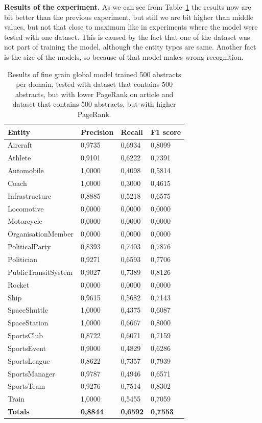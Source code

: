 \documentclass[thesis=M,english]{FITthesis}[2018/05/30]
\begin{document}
\textbf{Results of the experiment.} As we can see from Table~\ref{table:Global500FineDomainTestedWithTwo500Datasets} the results now are bit better than the previous experiment, but still we are bit higher than middle values, but not that close to maximum like in experiments where the model were tested with one dataset. This is caused by the fact that one of the dataset was not part of training the model, although the entity types are same. Another fact is the size of the models, so because of that model makes wrong recognition.

	\begin{table}[H]\centering
		\begin{tabular}{|l|l|l|l|}
			\hline {\textbf{Entity}} & {\textbf{Precision}} & {\textbf{Recall}} & {\textbf{F1 score}}\\\hline
				Aircraft & 0,9735 & 0,6934 & 0,8099\\
				Athlete & 0,9101 & 0,6222 & 0,7391\\
				Automobile & 1,0000 & 0,4098 & 0,5814\\ 
				Coach & 1,0000 & 0,3000 & 0,4615\\
				Infrastructure & 0,8885 & 0,5218 & 0,6575\\
				Locomotive & 0,0000 & 0,0000 & 0,0000\\
				Motorcycle & 0,0000 & 0,0000 & 0,0000\\
				OrganisationMember & 0,0000 & 0,0000 & 0,0000\\				
				PoliticalParty & 0,8393 & 0,7403 & 0,7876\\
				Politician & 0,9271 & 0,6593 & 0,7706\\
				PublicTransitSystem & 0,9027 & 0,7389 & 0,8126\\
				Rocket & 0,0000 & 0,0000 & 0,0000\\				
				Ship & 0,9615 & 0,5682 & 0,7143\\
				SpaceShuttle & 1,0000 & 0,4375 & 0,6087\\
				SpaceStation & 1,0000 & 0,6667 & 0,8000\\ 
				SportsClub & 0,8722 & 0,6071 & 0,7159\\
				SportsEvent & 0,9000 & 0,4829 & 0,6286\\
				SportsLeague & 0,8622 & 0,7357 & 0,7939\\
				SportsManager & 0,9787 & 0,4946 & 0,6571\\
				SportsTeam & 0,9276 & 0,7514 & 0,8302\\
				Train & 1,0000 & 0,5455 & 0,7059\\\hline
				\textbf{Totals} & \textbf{0,8844} & \textbf{0,6592} & \textbf{0,7553}\\\hline
		\end{tabular}
		\caption{Results of fine grain global model trained 500 abstracts per domain, tested with dataset that contains 500 abstracts, but with lower PageRank on article and dataset that contains 500 abstracts, but with higher PageRank.\label{table:Global500FineDomainTestedWithTwo500Datasets}}
	\end{table}
\end{document}
